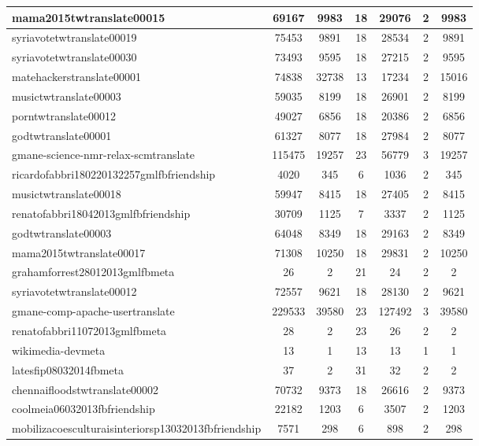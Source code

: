 \begin{table*}[h!]
\begin{center}
\begin{tabular}{| l | c | c | c | c | c | c |}
mama2015twtranslate00015 & 69167  & 9983  & 18  & 29076  & 2  & 9983 \\\hline
syriavotetwtranslate00019 & 75453  & 9891  & 18  & 28534  & 2  & 9891 \\\hline
syriavotetwtranslate00030 & 73493  & 9595  & 18  & 27215  & 2  & 9595 \\\hline
matehackerstranslate00001 & 74838  & 32738  & 13  & 17234  & 2  & 15016 \\\hline
musictwtranslate00003 & 59035  & 8199  & 18  & 26901  & 2  & 8199 \\\hline
porntwtranslate00012 & 49027  & 6856  & 18  & 20386  & 2  & 6856 \\\hline
godtwtranslate00001 & 61327  & 8077  & 18  & 27984  & 2  & 8077 \\\hline
gmane-science-nmr-relax-scmtranslate & 115475  & 19257  & 23  & 56779  & 3  & 19257 \\\hline
ricardofabbri180220132257gmlfbfriendship & 4020  & 345  & 6  & 1036  & 2  & 345 \\\hline
musictwtranslate00018 & 59947  & 8415  & 18  & 27405  & 2  & 8415 \\\hline
renatofabbri18042013gmlfbfriendship & 30709  & 1125  & 7  & 3337  & 2  & 1125 \\\hline
godtwtranslate00003 & 64048  & 8349  & 18  & 29163  & 2  & 8349 \\\hline
mama2015twtranslate00017 & 71308  & 10250  & 18  & 29831  & 2  & 10250 \\\hline
grahamforrest28012013gmlfbmeta & 26  & 2  & 21  & 24  & 2  & 2 \\\hline
syriavotetwtranslate00012 & 72557  & 9621  & 18  & 28130  & 2  & 9621 \\\hline
gmane-comp-apache-usertranslate & 229533  & 39580  & 23  & 127492  & 3  & 39580 \\\hline
renatofabbri11072013gmlfbmeta & 28  & 2  & 23  & 26  & 2  & 2 \\\hline
wikimedia-devmeta & 13  & 1  & 13  & 13  & 1  & 1 \\\hline
latesfip08032014fbmeta & 37  & 2  & 31  & 32  & 2  & 2 \\\hline
chennaifloodstwtranslate00002 & 70732  & 9373  & 18  & 26616  & 2  & 9373 \\\hline
coolmeia06032013fbfriendship & 22182  & 1203  & 6  & 3507  & 2  & 1203 \\\hline
mobilizacoesculturaisinteriorsp13032013fbfriendship & 7571  & 298  & 6  & 898  & 2  & 298 \\\hline

\end{tabular}
\end{center}
\end{table*}
